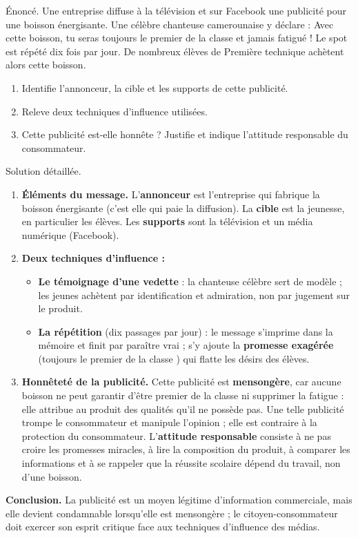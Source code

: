 \documentclass[11pt]{article}
\begin{document}
\begin{exoresolu}
Énoncé. Une entreprise diffuse à la télévision et sur Facebook une publicité pour une boisson énergisante. Une célèbre chanteuse camerounaise y déclare : \og Avec cette boisson, tu seras toujours le premier de la classe et jamais fatigué ! \fg{} Le spot est répété dix fois par jour. De nombreux élèves de Première technique achètent alors cette boisson.
\begin{enumerate}
\item Identifie l'annonceur, la cible et les supports de cette publicité.
\item Releve deux techniques d'influence utilisées.
\item Cette publicité est-elle honnête ? Justifie et indique l'attitude responsable du consommateur.
\end{enumerate}
\tcblower
Solution détaillée.
\begin{enumerate}
\item \textbf{Éléments du message.} L'\textbf{annonceur} est l'entreprise qui fabrique la boisson énergisante (c'est elle qui paie la diffusion). La \textbf{cible} est la jeunesse, en particulier les élèves. Les \textbf{supports} sont la télévision et un média numérique (Facebook).
\item \textbf{Deux techniques d'influence :}
\begin{itemize}
\item \textbf{Le témoignage d'une vedette} : la chanteuse célèbre sert de modèle ; les jeunes achètent par identification et admiration, non par jugement sur le produit.
\item \textbf{La répétition} (dix passages par jour) : le message s'imprime dans la mémoire et finit par paraître vrai ; s'y ajoute la \textbf{promesse exagérée} (\og toujours le premier de la classe \fg) qui flatte les désirs des élèves.
\end{itemize}
\item \textbf{Honnêteté de la publicité.} Cette publicité est \textbf{mensongère}, car aucune boisson ne peut garantir d'être premier de la classe ni supprimer la fatigue : elle attribue au produit des qualités qu'il ne possède pas. Une telle publicité trompe le consommateur et manipule l'opinion ; elle est contraire à la protection du consommateur. L'\textbf{attitude responsable} consiste à ne pas croire les promesses miracles, à lire la composition du produit, à comparer les informations et à se rappeler que la réussite scolaire dépend du travail, non d'une boisson.
\end{enumerate}
\textbf{Conclusion.} La publicité est un moyen légitime d'information commerciale, mais elle devient condamnable lorsqu'elle est mensongère ; le citoyen-consommateur doit exercer son esprit critique face aux techniques d'influence des médias.
\end{exoresolu}
\end{document}

